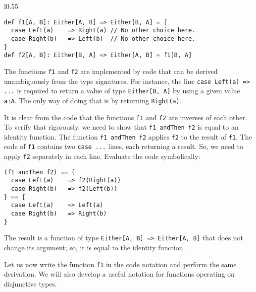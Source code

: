 \begin{wrapfigure}{l}{0.55\columnwidth}%
\vspace{-0.86\baselineskip}
\begin{lstlisting}
def f1[A, B]: Either[A, B] => Either[B, A] = {
  case Left(a)    => Right(a) // No other choice here.
  case Right(b)   => Left(b)  // No other choice here.
}
def f2[A, B]: Either[B, A] => Either[A, B] = f1[B, A]
\end{lstlisting}

\vspace{-1.2\baselineskip}
\end{wrapfigure}%
The functions \lstinline!f1! and \lstinline!f2! are implemented
by code that can be derived unambiguously from the type signatures.
For instance, the line \lstinline!case Left(a) => ...! is required
to return a value of type \lstinline!Either[B, A]! by using a given
value \lstinline!a:A!. The only way of doing that is by returning
\lstinline!Right(a)!.

It is clear from the code that the functions \lstinline!f1! and \lstinline!f2!
are inverses of each other. To verify that rigorously, we need to
show that \lstinline!f1 andThen f2! is equal to an identity function.
The function \lstinline!f1 andThen f2! applies \lstinline!f2! to
the result of \lstinline!f1!. The code of \lstinline!f1! contains
two \lstinline!case ...! lines, each returning a result. So, we need
to apply \lstinline!f2! separately in each line. Evaluate the code
symbolically:
\begin{lstlisting}
(f1 andThen f2) == {
  case Left(a)    => f2(Right(a))
  case Right(b)   => f2(Left(b))
} == {
  case Left(a)    => Left(a)
  case Right(b)   => Right(b)
}
\end{lstlisting}
The result is a function of type \lstinline!Either[A, B] => Either[A, B]!
that does not change its argument; so, it is equal to the identity
function. 

Let us now write the function \lstinline!f1! in the code notation
and perform the same derivation. We will also develop a useful notation
for functions operating on disjunctive types.

